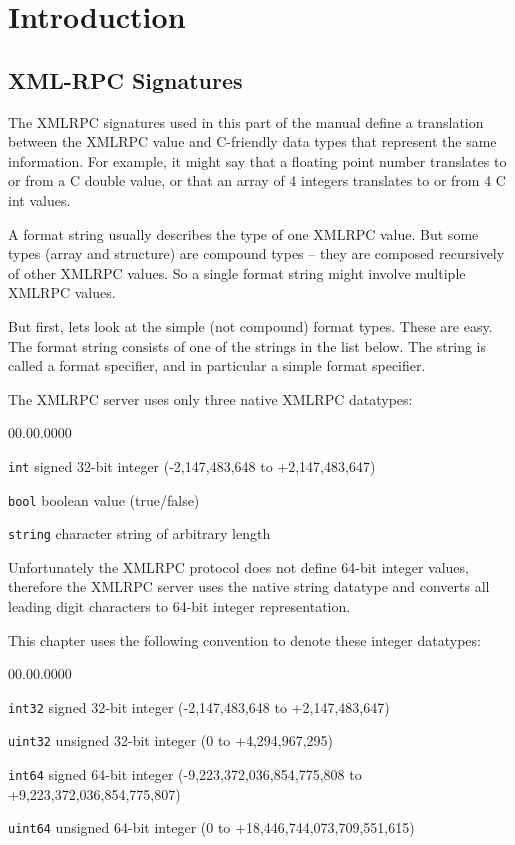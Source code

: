 \chapter{Introduction}
\label{ch:rpcref:intro}


\section{XML-RPC Signatures}

The XMLRPC signatures used in this part of the manual define a translation
between the XMLRPC value and C-friendly data types that represent the same
information. For example, it might say that a floating point number translates
to or from a C double value, or that an array of 4 integers translates to or
from 4 C int values.

A format string usually describes the type of one XMLRPC value. But some types
(array and structure) are compound types -- they are composed recursively of
other XMLRPC values. So a single format string might involve multiple XMLRPC
values.

But first, lets look at the simple (not compound) format types. These are easy.
The format string consists of one of the strings in the list below. The string
is called a format specifier, and in particular a simple format specifier.

The XMLRPC server uses only three native XMLRPC datatypes:

\begin{labeling}{00.00.0000}
\item [{\texttt{int}}] signed 32-bit integer (-2,147,483,648 to +2,147,483,647)
\item [{\texttt{bool}}] boolean value (true/false)
\item [{\texttt{string}}] character string of arbitrary length
\end{labeling}

Unfortunately the XMLRPC protocol does not define 64-bit integer values,
therefore the XMLRPC server uses the native string datatype and converts all
leading digit characters to 64-bit integer representation.

This chapter uses the following convention to denote these integer datatypes:

\begin{labeling}{00.00.0000}
\item [{\texttt{int32}}] signed 32-bit integer
	(-2,147,483,648 to +2,147,483,647)
\item [{\texttt{uint32}}] unsigned 32-bit integer
	(0 to +4,294,967,295)
\item [{\texttt{int64}}] signed 64-bit integer
	(-9,223,372,036,854,775,808 to +9,223,372,036,854,775,807)
\item [{\texttt{uint64}}] unsigned 64-bit integer
	(0 to +18,446,744,073,709,551,615)
\end{labeling}

